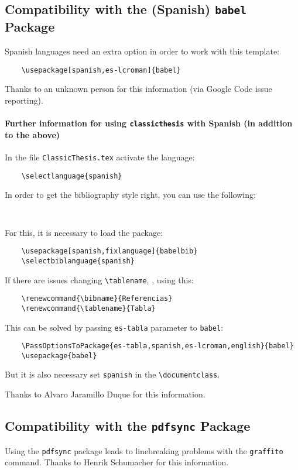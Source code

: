 \subsection*{Compatibility with the (Spanish) \texttt{babel} Package}
Spanish languages need an extra option in order to work with this template:
\begin{verbatim}
	\usepackage[spanish,es-lcroman]{babel}
\end{verbatim}
Thanks to an unknown person for this information (via Google Code issue reporting). 


\paragraph{Further information for using \texttt{classicthesis} with Spanish (in addition to the above)}
In the file \texttt{ClassicThesis.tex} activate the language: 
\begin{verbatim}
	\selectlanguage{spanish}
\end{verbatim}
	
In order to get the bibliography style right, you can use the following:
\begin{verbatim}
	
\end{verbatim}

For this, it is necessary to load the package:
\begin{verbatim}
	\usepackage[spanish,fixlanguage]{babelbib}
	\selectbiblanguage{spanish}
\end{verbatim}

If there are issues changing \verb|\tablename|, \eg, using this:
\begin{verbatim}
	\renewcommand{\bibname}{Referencias}
	\renewcommand{\tablename}{Tabla}
\end{verbatim}

This can be solved by passing \texttt{es-tabla} parameter to \texttt{babel}:
\begin{verbatim}
	\PassOptionsToPackage{es-tabla,spanish,es-lcroman,english}{babel}
	\usepackage{babel}
\end{verbatim}

But it is also necessary set \texttt{spanish} in the \verb|\documentclass|.

Thanks to Alvaro Jaramillo Duque for this information. 


\subsection*{Compatibility with the \texttt{pdfsync} Package}
Using the \texttt{pdfsync} package leads to linebreaking problems with the \texttt{graffito} command. 
Thanks to Henrik Schumacher for this information. 



